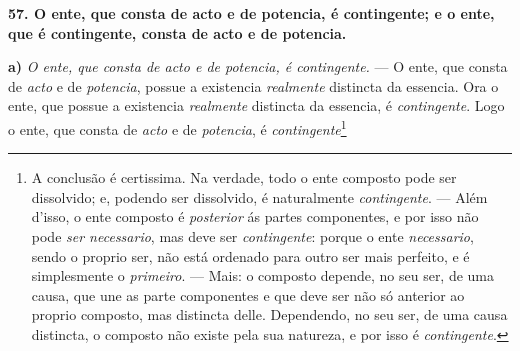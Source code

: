 \textbf{57. O ente, que consta de acto e de potencia, é contingente; e o ente, que é contingente, consta de acto e de potencia.}

\textbf{a)} \emph{O ente, que consta de acto e de potencia, é contingente.} --- O ente, que consta de \emph{acto} e de \emph{potencia}, possue a existencia \emph{realmente} distincta da essencia. Ora o ente, que possue a existencia \emph{realmente} distincta da essencia, é \emph{contingente}. Logo o ente, que consta de \emph{acto} e de \emph{potencia}, é \emph{contingente}\footnote{A conclusão é certissima. Na verdade, todo o ente composto pode ser dissolvido; e, podendo ser dissolvido, é naturalmente \emph{contingente}. --- Além d'isso, o ente composto é \emph{posterior} ás partes componentes, e por isso não pode \emph{ser necessario}, mas deve ser \emph{contingente}: porque o ente \emph{necessario}, sendo o proprio ser, não está ordenado para outro ser mais perfeito, e é simplesmente o \emph{primeiro}. --- Mais: o composto depende, no seu ser, de uma causa, que une as parte componentes e que deve ser não só anterior ao proprio composto, mas distincta delle. Dependendo, no seu ser, de uma causa distincta, o composto não existe pela sua natureza, e por isso é \emph{contingente}.}